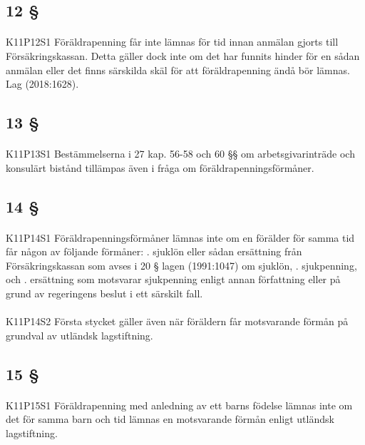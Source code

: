 \documentclass[a4paper,notitlepage,openany,10pt]{book}
\begin{document}
\subsection*{12 §}
\paragraph*{}
{\tiny K11P12S1}
Föräldrapenning får inte lämnas för tid innan anmälan gjorts till Försäkringskassan. Detta gäller dock inte om det har funnits hinder för en sådan anmälan eller det finns särskilda skäl för att föräldrapenning ändå bör lämnas.
Lag (2018:1628).
\subsection*{13 §}
\paragraph*{}
{\tiny K11P13S1}
Bestämmelserna i 27 kap. 56-58 och 60 §§ om arbetsgivarinträde och konsulärt bistånd tillämpas även i fråga om föräldrapenningsförmåner.
\subsection*{14 §}
\paragraph*{}
{\tiny K11P14S1}
Föräldrapenningsförmåner lämnas inte om en förälder för samma tid får någon av följande förmåner:
. sjuklön eller sådan ersättning från Försäkringskassan som avses i 20 § lagen (1991:1047) om sjuklön,
. sjukpenning, och
. ersättning som motsvarar sjukpenning enligt annan författning eller på grund av regeringens beslut i ett särskilt fall.
\paragraph*{}
{\tiny K11P14S2}
Första stycket gäller även när föräldern får motsvarande förmån på grundval av utländsk lagstiftning.
\subsection*{15 §}
\paragraph*{}
{\tiny K11P15S1}
Föräldrapenning med anledning av ett barns födelse lämnas inte om det för samma barn och tid lämnas en motsvarande förmån enligt utländsk lagstiftning.
\end{document}
